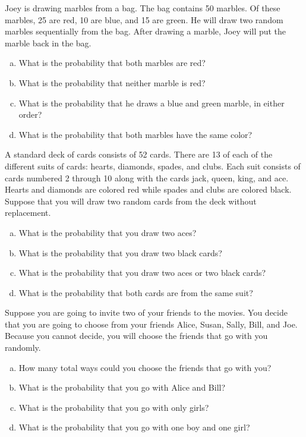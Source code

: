 \documentclass[11pt,letterpaper]{article}
\begin{document}

 Joey is drawing marbles from a bag. The bag contains 50 marbles. Of these marbles, 25 are red, 10 are blue, and 15 are green. He will draw two random marbles sequentially from the bag. After drawing a marble, Joey will put the marble back in the bag.
	\begin{enumerate}[(a)]
	\item What is the probability that both marbles are red?
	\item What is the probability that neither marble is red?
	\item What is the probability that he draws a blue and green marble, in either order?
	\item What is the probability that both marbles have the same color?
	\end{enumerate}



\newpage



 A standard deck of cards consists of 52 cards. There are 13 of each of the different suits of cards: hearts, diamonds, spades, and clubs. Each suit consists of cards numbered 2 through 10 along with the cards jack, queen, king, and ace. Hearts and diamonds are colored red while spades and clubs are colored black. Suppose that you will draw two random cards from the deck without replacement.
	\begin{enumerate}[(a)]
	\item What is the probability that you draw two aces?
	\item What is the probability that you draw two black cards?
	\item What is the probability that you draw two aces or two black cards?
	\item What is the probability that both cards are from the same suit?
	\end{enumerate}



\newpage



 Suppose you are going to invite two of your friends to the movies. You decide that you are going to choose from your friends Alice, Susan, Sally, Bill, and Joe. Because you cannot decide, you will choose the friends that go with you randomly. 
	\begin{enumerate}[(a)]
	\item How many total ways could you choose the friends that go with you?
	\item What is the probability that you go with Alice and Bill?
	\item What is the probability that you go with only girls?
	\item What is the probability that you go with one boy and one girl?
	\end{enumerate}
\end{document}
